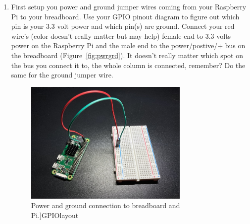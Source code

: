 \documentclass{article}\usepackage[]{graphicx}\usepackage[]{color}
\begin{document}
\begin{enumerate}
\item First setup you power and ground jumper wires coming from your Raspberry Pi to your breadboard. Use your GPIO pinout diagram to figure out which pin is your 3.3 volt power and which pin(s) are ground. Connect your red wire's (color doesn't really matter but may help) female end to 3.3 volts power on the Raspberry Pi and the male end to the power/postive/+ bus on the breadboard (Figure~\ref{fig:pwrgrd}). It doesn't really matter which spot on the bus you connect it to, the whole column is connected, remember? Do the same for the ground jumper wire.

\begin{figure}[h]
\begin{center}
\includegraphics[width=0.75\textwidth]{pwrgnd}
\caption{Power and ground connection to breadboard and Pi.]{GPIOlayout}\label{GPIO}}
\end{center}
\end{figure}


\end{enumerate}
\end{document}
